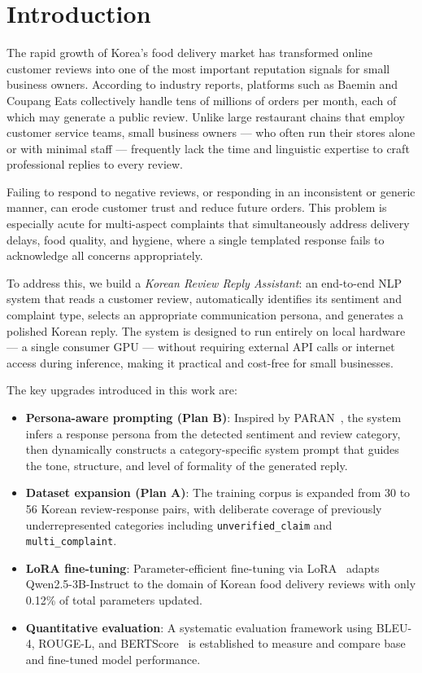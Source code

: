 \documentclass[conference]{IEEEtran}
\begin{document}
\section{Introduction}

The rapid growth of Korea's food delivery market has transformed online
customer reviews into one of the most important reputation signals for
small business owners.
According to industry reports, platforms such as Baemin and Coupang
Eats collectively handle tens of millions of orders per month, each of
which may generate a public review.
Unlike large restaurant chains that employ customer service teams,
small business owners — who often run their stores alone or with minimal
staff — frequently lack the time and linguistic expertise to craft
professional replies to every review.

Failing to respond to negative reviews, or responding in an inconsistent
or generic manner, can erode customer trust and reduce future orders.
This problem is especially acute for multi-aspect complaints that
simultaneously address delivery delays, food quality, and hygiene,
where a single templated response fails to acknowledge all concerns
appropriately.

To address this, we build a \textit{Korean Review Reply Assistant}: an
end-to-end NLP system that reads a customer review, automatically
identifies its sentiment and complaint type, selects an appropriate
communication persona, and generates a polished Korean reply.
The system is designed to run entirely on local hardware — a single
consumer GPU — without requiring external API calls or internet access
during inference, making it practical and cost-free for small businesses.

The key upgrades introduced in this work are:
\begin{itemize}
    \item \textbf{Persona-aware prompting (Plan B)}: Inspired by
          PARAN~\cite{paran2024}, the system infers a response persona
          from the detected sentiment and review category, then
          dynamically constructs a category-specific system prompt that
          guides the tone, structure, and level of formality of the
          generated reply.
    \item \textbf{Dataset expansion (Plan A)}: The training corpus is
          expanded from 30 to 56 Korean review-response pairs, with
          deliberate coverage of previously underrepresented categories
          including \texttt{unverified\_claim} and \texttt{multi\_complaint}.
    \item \textbf{LoRA fine-tuning}: Parameter-efficient fine-tuning
          via LoRA~\cite{lora2022} adapts Qwen2.5-3B-Instruct to the
          domain of Korean food delivery reviews with only 0.12\% of
          total parameters updated.
    \item \textbf{Quantitative evaluation}: A systematic evaluation
          framework using BLEU-4, ROUGE-L, and BERTScore~\cite{bertscore2020}
          is established to measure and compare base and fine-tuned
          model performance.
\end{itemize}
\end{document}
